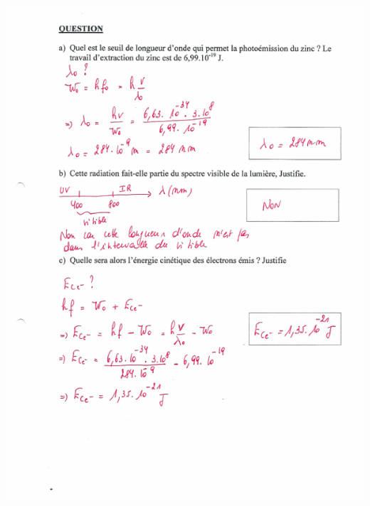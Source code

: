 {{{\includegraphics[width=17.498cm,height=24.13cm]{Pictures/10000001000002570000033BB37256DDDEE8E8E4.png}

}}}
